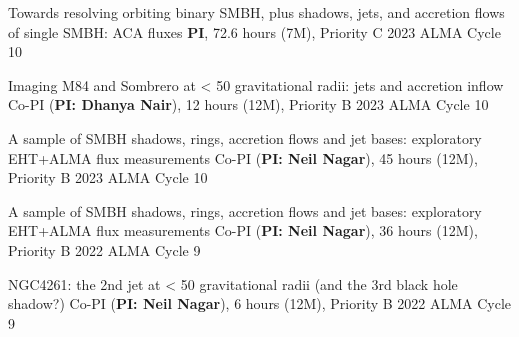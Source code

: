 
\begin{cvpublications}{}

	 {Towards resolving orbiting binary SMBH, plus shadows, jets, and accretion flows of single SMBH: ACA fluxes}
	 {\textbf{PI}, 72.6 hours (7M), Priority C}
	 {2023}
     {ALMA Cycle 10}
     {}

	 {Imaging M84 and Sombrero at < 50 gravitational radii: jets and accretion inflow}
	 {Co-PI (\textbf{PI: Dhanya Nair}), 12 hours (12M), Priority B}
	 {2023}
     {ALMA Cycle 10}
     {}

	 {A sample of SMBH shadows, rings, accretion flows and jet bases: exploratory EHT+ALMA flux measurements}
	 {Co-PI (\textbf{PI: Neil Nagar}), 45 hours (12M), Priority B}
	 {2023}
     {ALMA Cycle 10}
     {}

	 {A sample of SMBH shadows, rings, accretion flows and jet bases: exploratory EHT+ALMA flux measurements}
	 {Co-PI (\textbf{PI: Neil Nagar}), 36 hours (12M), Priority B}
	 {2022}
     {ALMA Cycle 9}
     {}

	 {NGC4261: the 2nd jet at < 50 gravitational radii (and the 3rd black hole shadow?)}
	 {Co-PI (\textbf{PI: Neil Nagar}), 6 hours (12M), Priority B}
	 {2022}
     {ALMA Cycle 9}
     {}

\end{cvpublications}